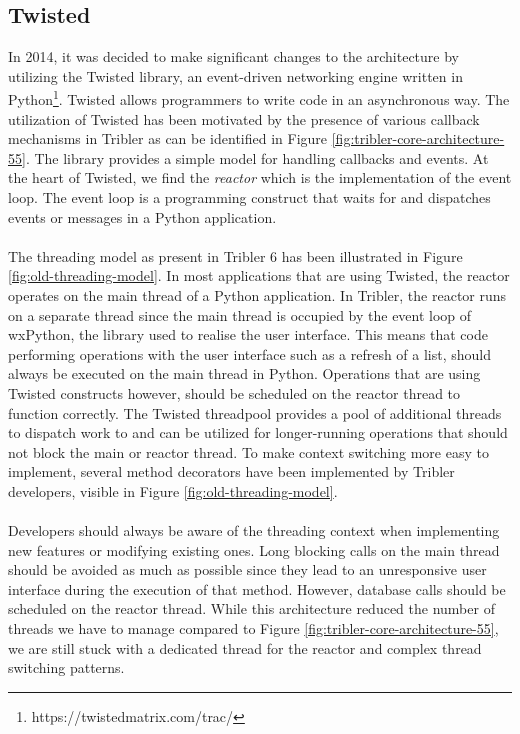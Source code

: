 \subsection{Twisted}
\label{subsec:architecture-twisted}
In 2014, it was decided to make significant changes to the architecture by utilizing the Twisted library, an event-driven networking engine written in Python\footnote{https://twistedmatrix.com/trac/}. Twisted allows programmers to write code in an asynchronous way. The utilization of Twisted has been motivated by the presence of various callback mechanisms in Tribler as can be identified in Figure \ref{fig:tribler-core-architecture-55}. The library provides a simple model for handling callbacks and events. At the heart of Twisted, we find the \emph{reactor} which is the implementation of the event loop\cite{twistedreactoroverview}. The event loop is a programming construct that waits for and dispatches events or messages in a Python application.\\\\
The threading model as present in Tribler 6 has been illustrated in Figure \ref{fig:old-threading-model}. In most applications that are using Twisted, the reactor operates on the main thread of a Python application. In Tribler, the reactor runs on a separate thread since the main thread is occupied by the event loop of wxPython, the library used to realise the user interface. This means that code performing operations with the user interface such as a refresh of a list, should always be executed on the main thread in Python. Operations that are using Twisted constructs however, should be scheduled on the reactor thread to function correctly. The Twisted threadpool provides a pool of additional threads to dispatch work to and can be utilized for longer-running operations that should not block the main or reactor thread. To make context switching more easy to implement, several method decorators have been implemented by Tribler developers, visible in Figure \ref{fig:old-threading-model}.\\\\
Developers should always be aware of the threading context when implementing new features or modifying existing ones. Long blocking calls on the main thread should be avoided as much as possible since they lead to an unresponsive user interface during the execution of that method. However, database calls should be scheduled on the reactor thread. While this architecture reduced the number of threads we have to manage compared to Figure \ref{fig:tribler-core-architecture-55}, we are still stuck with a dedicated thread for the reactor and complex thread switching patterns.

